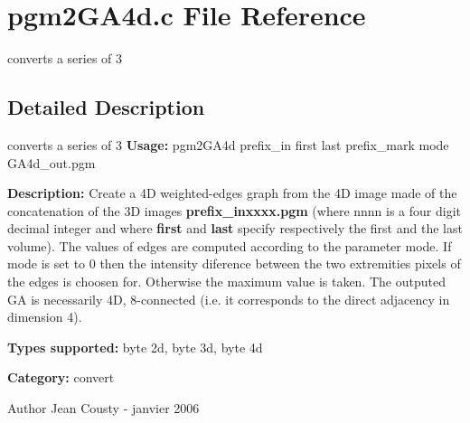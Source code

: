 \section{pgm2GA4d.c File Reference}
\label{pgm2GA4d_8c}


converts a series of 3  




\subsection{Detailed Description}
converts a series of 3 {\bfseries Usage:} pgm2GA4d prefix\_\-in first last prefix\_\-mark mode GA4d\_\-out.pgm

{\bfseries Description:} Create a 4D weighted-\/edges graph from the 4D image made of the concatenation of the 3D images {\bfseries prefix\_\-inxxxx.pgm} (where nnnn is a four digit decimal integer and where {\bfseries first} and {\bfseries last} specify respectively the first and the last volume). The values of edges are computed according to the parameter mode. If mode is set to 0 then the intensity diference between the two extremities pixels of the edges is choosen for. Otherwise the maximum value is taken. The outputed GA is necessarily 4D, 8-\/connected (i.e. it corresponds to the direct adjacency in dimension 4).

{\bfseries Types supported:} byte 2d, byte 3d, byte 4d

{\bfseries Category:} convert

\begin{DoxyAuthor}{Author}
Jean Cousty -\/ janvier 2006 
\end{DoxyAuthor}
